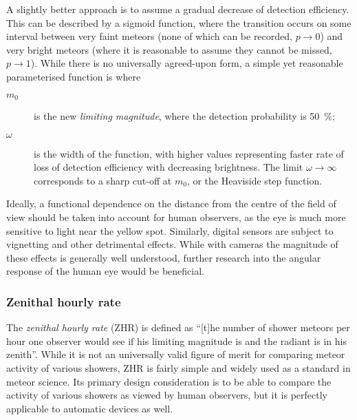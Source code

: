             A slightly better approach is to assume a gradual decrease of detection efficiency.
            This can be described by a sigmoid function, where the transition occurs on some interval
            between very faint meteors (none of which can be recorded, $p \to 0$)
            and very bright meteors (where it is reasonable to assume they cannot be missed, $p \to 1$).
            While there is no universally agreed-upon form, a simple yet reasonable parameterised function is
            where
            \begin{description}
                \item[$m_0$]    is the new \emph{limiting magnitude}, where the detection probability is \SI{50}{\percent};
                \item[$\omega$] is the width of the function, with higher values representing
                    faster rate of loss of detection efficiency with decreasing brightness.
                    The limit $\omega \to \infty$ corresponds to a sharp cut-off at $m_0$,
                    or the Heaviside step function.
            \end{description}

            Ideally, a functional dependence on the distance from the centre of the field
            of view should be taken into account for human observers, as the eye is much more
            sensitive to light near the yellow spot.
            Similarly, digital sensors are subject to vignetting and other detrimental effects.
            While with cameras the magnitude of these effects is generally well understood,
            further research into the angular response of the human eye would be beneficial.

        \subsubsection{Zenithal hourly rate} \label{msaz}
            The \emph{zenithal hourly rate} (ZHR) is defined as ``[t]he number of shower meteors per hour
            one observer would see if his limiting magnitude is  and the radiant is in his zenith''.
            While it is not an universally valid figure of merit for comparing meteor activity of various showers,
            ZHR is fairly simple and widely used as a standard in meteor science.
            Its primary design consideration is to be able to compare the activity of various showers
            as viewed by human observers, but it is perfectly applicable to automatic devices as well.

